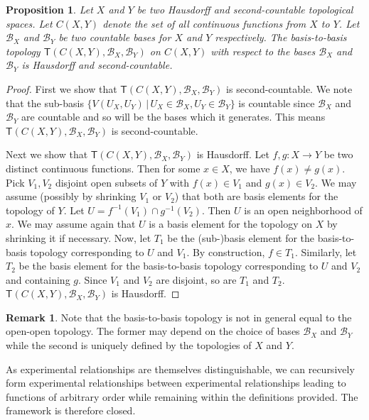 \documentclass{amsart}
\newtheorem{prop}[thm]{Proposition}
\theoremstyle{definition}
\newtheorem{rem}[thm]{Remark}
\numberwithin{equation}{section}
\begin{document}
\begin{prop}
	Let $X$ and $Y$ be two Hausdorff and second-countable topological spaces. Let $C(X,Y)$ denote the set of all continuous functions from $X$ to $Y$. Let $\mathcal{B}_X$ and $\mathcal{B}_Y$ be two countable bases for $X$ and $Y$ respectively. The basis-to-basis topology $\mathsf{T}(C(X,Y), \mathcal{B}_X, \mathcal{B}_Y)$ on $C(X,Y)$ with respect to the bases $\mathcal{B}_X$ and $\mathcal{B}_Y$ is Hausdorff and second-countable. 
\end{prop}
\begin{proof}
	First we show that $\mathsf{T}(C(X,Y), \mathcal{B}_X, \mathcal{B}_Y)$ is second-countable. We note that the sub-basis $\{V(U_X, U_Y) \, |\,   U_X \in \mathcal{B}_X , U_Y \in \mathcal{B}_Y \}$ is countable since $\mathcal{B}_X$ and $\mathcal{B}_Y$ are countable and so will be the bases which it generates. This means $\mathsf{T}(C(X,Y), \mathcal{B}_X, \mathcal{B}_Y)$ is second-countable.
	
	Next we show that $\mathsf{T}(C(X,Y), \mathcal{B}_X, \mathcal{B}_Y)$ is Hausdorff. Let $f,g:X\to Y$ be two distinct continuous functions. Then for some $x\in X$, we have $f(x)\neq g(x)$. Pick $V_1, V_2$ disjoint open subsets of $Y$ with $f(x)\in V_1$ and $g(x)\in V_2$. We may assume (possibly by shrinking $V_1$ or $V_2$) that both are basis elements for the topology of $Y$. Let $U=f^{-1}(V_1)\cap g^{-1}(V_2)$. Then $U$ is an open neighborhood of $x$. We may assume again that $U$ is a basis element for the topology on $X$ by shrinking it if necessary. Now, let $T_1$ be the (sub-)basis element for the basis-to-basis topology corresponding to $U$ and $V_1$. By construction, $f\in T_1$. Similarly, let $T_2$ be the basis element for the basis-to-basis topology corresponding to $U$ and $V_2$ and containing $g$. Since $V_1$ and $V_2$ are disjoint, so are $T_1$ and $T_2$. $\mathsf{T}(C(X,Y), \mathcal{B}_X, \mathcal{B}_Y)$ is Hausdorff.
\end{proof}

\begin{rem}
	Note that the basis-to-basis topology is not in general equal to the open-open topology. The former may depend on the choice of bases $\mathcal{B}_X$ and $\mathcal{B}_Y$ while the second is uniquely defined by the topologies of $X$ and $Y$.
\end{rem}

As experimental relationships are themselves distinguishable, we can recursively form experimental relationships between experimental relationships leading to functions of arbitrary order while remaining within the definitions provided. The framework is therefore closed.
\end{document}
